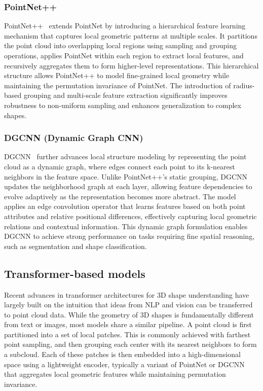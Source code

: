\subsubsection{PointNet++}

PointNet++~\cite{pointnet++} extends PointNet by introducing a hierarchical feature learning mechanism that captures local geometric patterns at multiple scales. It partitions the point cloud into overlapping local regions using sampling and grouping operations, applies PointNet within each region to extract local features, and recursively aggregates them to form higher-level representations. This hierarchical structure allows PointNet++ to model fine-grained local geometry while maintaining the permutation invariance of PointNet. The introduction of radius-based grouping and multi-scale feature extraction significantly improves robustness to non-uniform sampling and enhances generalization to complex shapes.

\subsubsection{DGCNN (Dynamic Graph CNN)}

DGCNN~\cite{dgcnn} further advances local structure modeling by representing the point cloud as a dynamic graph, where edges connect each point to its k-nearest neighbors in the feature space. Unlike PointNet++’s static grouping, DGCNN updates the neighborhood graph at each layer, allowing feature dependencies to evolve adaptively as the representation becomes more abstract. The model applies an edge convolution operator that learns features based on both point attributes and relative positional differences, effectively capturing local geometric relations and contextual information. This dynamic graph formulation enables DGCNN to achieve strong performance on tasks requiring fine spatial reasoning, such as segmentation and shape classification.

\subsection{Transformer-based models}
\label{ssec:transformer_based_models}

Recent advances in transformer architectures for 3D shape understanding have largely built on the intuition that ideas from NLP and vision can be transferred to point cloud data. While the geometry of 3D shapes is fundamentally different from text or images, most models share a similar pipeline. A point cloud is first partitioned into a set of local patches. This is commonly achieved with farthest point sampling, and then grouping each center with its nearest neighbors to form a subcloud. Each of these patches is then embedded into a high-dimensional space using a lightweight encoder, typically a variant of PointNet or DGCNN that aggregates local geometric features while maintaining permutation invariance.

